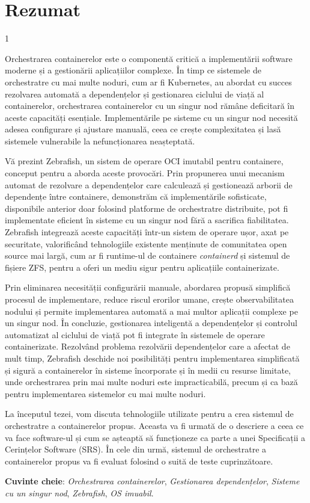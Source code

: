\chapter*{Rezumat}
\begin{spacing}{1}

Orchestrarea containerelor este o componentă critică a implementării software moderne și a gestionării aplicațiilor complexe. În timp ce sistemele de orchestratre cu mai multe noduri, cum ar fi Kubernetes, au abordat cu succes rezolvarea automată a dependențelor și gestionarea ciclului de viață al containerelor, orchestrarea containerelor cu un singur nod rămâne deficitară în aceste capacități esențiale. Implementările pe sisteme cu un singur nod necesită adesea configurare și ajustare manuală, ceea ce crește complexitatea și lasă sistemele vulnerabile la nefuncționarea neașteptată.

Vă prezint Zebrafish, un sistem de operare OCI imutabil pentru containere, conceput pentru a aborda aceste provocări. Prin propunerea unui mecanism automat de rezolvare a dependențelor care calculează și gestionează arborii de dependențe între containere, demonstrăm că implementările sofisticate, disponibile anterior doar folosind platforme de orchestratre distribuite, pot fi implementate eficient în sisteme cu un singur nod fără a sacrifica fiabilitatea. Zebrafish integrează aceste capacități într-un sistem de operare ușor, axat pe securitate, valorificând tehnologiile existente menținute de comunitatea open source mai largă, cum ar fi runtime-ul de containere \textit{containerd} și sistemul de fișiere ZFS, pentru a oferi un mediu sigur pentru aplicațiile containerizate.

Prin eliminarea necesității configurării manuale, abordarea propusă simplifică procesul de implementare, reduce riscul erorilor umane, crește observabilitatea nodului și permite implementarea automată a mai multor aplicații complexe pe un singur nod. În concluzie, gestionarea inteligentă a dependențelor și controlul automatizat al ciclului de viață pot fi integrate în sistemele de operare containerizate. Rezolvând problema rezolvării dependențelor care a afectat de mult timp, Zebrafish deschide noi posibilități pentru implementarea simplificată și sigură a containerelor în sisteme încorporate și în medii cu resurse limitate, unde orchestrarea prin mai multe noduri este impracticabilă, precum și ca bază pentru implementarea sistemelor cu mai multe noduri.

La începutul tezei, vom discuta tehnologiile utilizate pentru a crea sistemul de orchestratre a containerelor propus. Aceasta va fi urmată de o descriere a ceea ce va face software-ul și cum se așteaptă să funcționeze ca parte a unei Specificații a Cerințelor Software (SRS). În cele din urmă, sistemul de orchestratre a containerelor propus va fi evaluat folosind o suită de teste cuprinzătoare.

\vskip 0.5cm

\textbf{Cuvinte cheie}: \textit{Orchestrarea containerelor}, \textit{Gestionarea dependențelor}, \textit{Sisteme cu un singur nod}, \textit{Zebrafish}, \textit{OS imuabil}.
\end{spacing}
\vfill
{}


